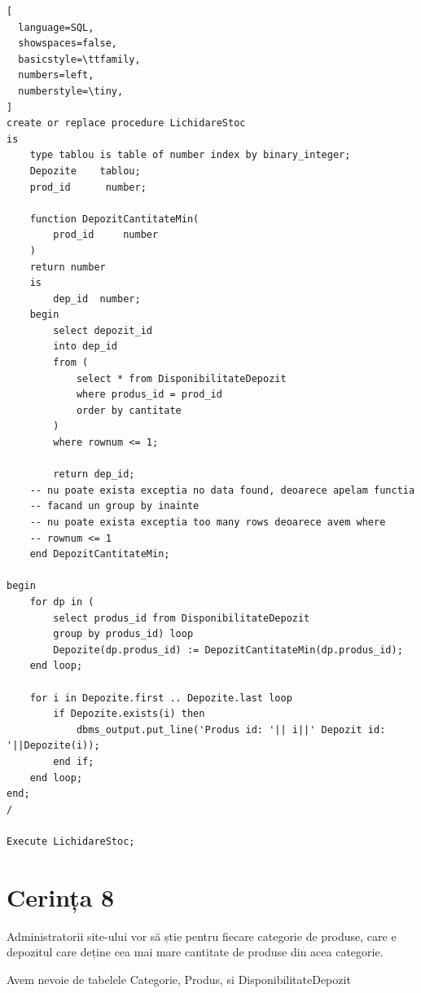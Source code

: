 \documentclass[12pt]{article}
\begin{document}
\vspace{0.5em}

\begin{lstlisting}[
  language=SQL,
  showspaces=false,
  basicstyle=\ttfamily,
  numbers=left,
  numberstyle=\tiny,
]
create or replace procedure LichidareStoc
is
    type tablou is table of number index by binary_integer;
    Depozite    tablou;
    prod_id      number;
    
    function DepozitCantitateMin(
        prod_id     number
    )
    return number
    is
        dep_id  number;
    begin
        select depozit_id
        into dep_id
        from (
            select * from DisponibilitateDepozit
            where produs_id = prod_id
            order by cantitate
        )
        where rownum <= 1;
        
        return dep_id;
    -- nu poate exista exceptia no data found, deoarece apelam functia 
    -- facand un group by inainte
    -- nu poate exista exceptia too many rows deoarece avem where
    -- rownum <= 1
    end DepozitCantitateMin;
    
begin
    for dp in (
        select produs_id from DisponibilitateDepozit
        group by produs_id) loop
        Depozite(dp.produs_id) := DepozitCantitateMin(dp.produs_id);
    end loop;
    
    for i in Depozite.first .. Depozite.last loop
        if Depozite.exists(i) then
            dbms_output.put_line('Produs id: '|| i||' Depozit id: '||Depozite(i));
        end if;
    end loop;
end;
/

Execute LichidareStoc;
\end{lstlisting}

\pagebreak

\section{Cerința 8}
Administratorii site-ului vor să știe pentru fiecare categorie de produse,
care e depozitul care deține cea mai mare cantitate de produse din acea
categorie.

Avem nevoie de tabelele Categorie, Produs, si DisponibilitateDepozit

\vspace{0.5em}
\end{document}
